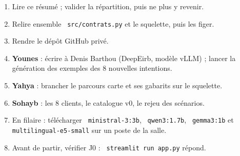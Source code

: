 \documentclass[11pt,a4paper]{article}
\DeclareRobustCommand{\f}[1]{{\texttt{\small
  \renewcommand{\_}{\char`\_\allowbreak}#1}}}
\begin{document}
\begin{enumerate}
  \item Lire ce résumé ; valider la répartition, puis ne plus y revenir.
  \item Relire ensemble \f{src/contrats.py} et le squelette, puis les figer.
  \item Rendre le dépôt GitHub privé.
  \item \textbf{Younes} : écrire à Denis Barthou (DeepEirb, modèle vLLM) ; lancer la génération des
        exemples des 8 nouvelles intentions.
  \item \textbf{Yahya} : brancher le parcours carte et ses gabarits sur le squelette.
  \item \textbf{Sohayb} : les 8 clients, le catalogue v0, le rejeu des scénarios.
  \item En filaire : télécharger \f{ministral-3:3b}, \f{qwen3:1.7b}, \f{gemma3:1b} et
        \f{multilingual-e5-small} sur un poste de la salle.
  \item Avant de partir, vérifier J0 : \f{streamlit run app.py} répond.
\end{enumerate}
\end{document}
